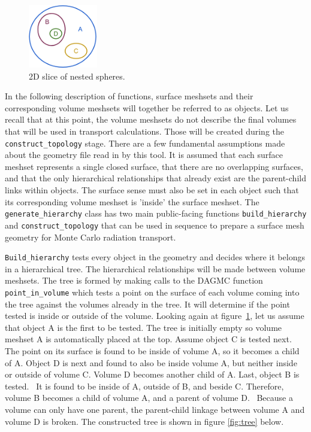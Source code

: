 \documentclass{anstrans}
\begin{document}
\begin{figure}[ht]
 \centering
 \includegraphics[width=0.27\textwidth]{../figs/nested_spheres.png}
 \caption{2D slice of nested spheres.}
 \label{fig:spheres}
\end{figure}

In the following description of functions, surface meshsets and their corresponding volume meshsets will
together be referred to as objects.  Let us recall that at this point, the volume meshsets do not describe the final volumes
that will be used in transport calculations.  Those will be created during the \texttt{construct\_topology} stage.  
There are a few fundamental assumptions made about the geometry file read in by this tool.
It is assumed that each surface meshset represents a single closed surface, that there are no
overlapping surfaces, and that the only hierarchical relationships that already exist are the parent-child links
within objects.  The surface sense must also be set in each object such that its corresponding volume
meshset is 'inside' the surface meshset.  The \texttt{generate\_hierarchy} class has two main public-facing functions
\texttt{build\_hierarchy} and \texttt{construct\_topology} that can be used in sequence
to prepare a surface mesh geometry for Monte Carlo radiation transport.

\texttt{Build\_hierarchy} tests every object in the geometry and decides where it belongs
in a hierarchical tree.  The hierarchical relationships will be made between volume meshsets.  
The tree is formed by making calls to the DAGMC function \texttt{point\_in\_volume} 
which tests a point on the surface of each volume coming into the tree against the volumes already in the tree.  It will determine if
the point tested is inside or outside of the volume.  Looking again at figure~\ref{fig:spheres}, let us assume that
object A is the first to be tested. The tree is initially empty so volume meshset A is automatically placed at the top.  Assume object C
is tested next.  The point on its surface is found to be inside of volume A, so it becomes a child of A.  Object D is next 
and found to also be inside volume A, but neither inside or outside of volume C.  Volume D becomes another child of A.
Last, object B is tested.  It is found to be inside of A, outside of B, and beside C.  Therefore, volume B becomes a
child of volume A, and a parent of volume D.  Because a volume can only have one parent, the parent-child linkage
between volume A and volume D is broken.  The constructed tree is shown in figure \ref{fig:tree} below.
\end{document}
